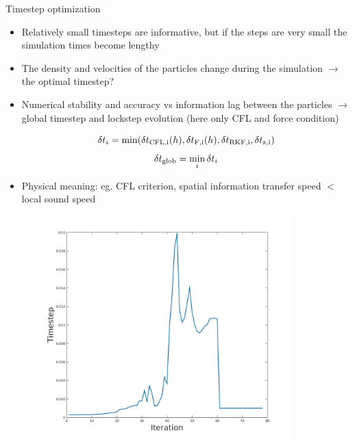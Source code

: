 \documentclass{beamer}
\begin{document}
\begin{frame}{Timestep optimization}
\begin{itemize}

\item Relatively small timesteps are informative, but if the steps are very small the simulation times become lengthy
\item The density and velocities of the particles change during the simulation $\rightarrow$ the optimal timestep?
\item Numerical stability and accuracy vs information lag between the particles $\rightarrow$ global timestep and lockstep evolution (here only CFL and force condition)

\begin{equation}
\delta t_{i} = \min(\delta t_{\rm CFL,i}(h),\delta t_{\rm F,i}(h),\delta t_{\rm RKF,i},\delta t_{\rm 
z,i})
\end{equation}
\begin{equation}
\delta t_{\rm glob} = \min_i{\delta t_i}
\end{equation}

\item Physical meaning: eg. CFL criterion, spatial information transfer speed $<$ local sound speed

\end{itemize}
\end{frame}

\begin{figure}[!ht]
\begin{center}
\includegraphics[width=10cm]{tStep_behaviour.jpg} 

\end{center}
\end{figure}
\end{document}
